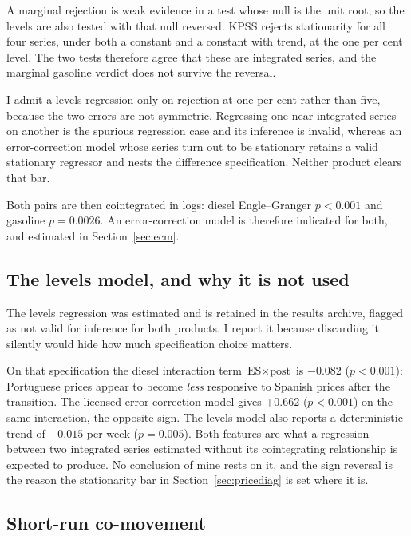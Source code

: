 \documentclass[11pt,a4paper]{article}
\begin{document}
A marginal rejection is weak evidence in a test whose null is the unit root, so the levels are
also tested with that null reversed. KPSS \citep{kwiatkowski1992testing} rejects stationarity for all four series, under both a
constant and a constant with trend, at the one per cent level. The two tests therefore agree
that these are integrated series, and the marginal gasoline verdict does not survive the
reversal.

I admit a levels regression only on rejection at one per cent rather than five, because the two
errors are not symmetric. Regressing one near-integrated series on another is the spurious
regression case and its inference is invalid, whereas an error-correction model whose series
turn out to be stationary retains a valid stationary regressor and nests the difference
specification. Neither product clears that bar.

Both pairs are then cointegrated in logs: diesel Engle--Granger $p<0.001$ and gasoline
$p=0.0026$. An error-correction model is therefore indicated for both, and estimated in
Section~\ref{sec:ecm}.

\subsection{The levels model, and why it is not used}
\label{sec:levels}

The levels regression was estimated and is retained in the results archive, flagged as not valid
for inference for both products. I report it because discarding it silently would hide how much
specification choice matters.

On that specification the diesel interaction term $\text{ES}\times\text{post}$ is $-0.082$
($p<0.001$): Portuguese prices appear to become \emph{less} responsive to Spanish prices after
the transition. The licensed error-correction model gives $+0.662$ ($p<0.001$) on the same
interaction, the opposite sign. The levels model also reports a deterministic trend of $-0.015$
per week ($p=0.005$). Both features are what a regression between two integrated series
estimated without its cointegrating relationship is expected to produce. No conclusion of mine
rests on it, and the sign reversal is the reason the stationarity bar in
Section~\ref{sec:pricediag} is set where it is.

\subsection{Short-run co-movement}
\label{sec:shortrun}
\end{document}
